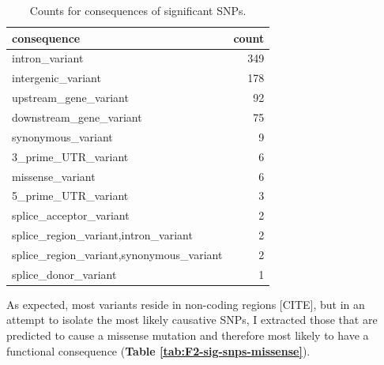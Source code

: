 \documentclass[
]{book}
\begin{document}
\begin{table}

\caption{\label{tab:F2-sig-snps-consq-counts}Counts for consequences of significant SNPs.}
\centering
\begin{tabular}[t]{l|r}
\hline
consequence & count\\
\hline
intron\_variant & 349\\
\hline
intergenic\_variant & 178\\
\hline
upstream\_gene\_variant & 92\\
\hline
downstream\_gene\_variant & 75\\
\hline
synonymous\_variant & 9\\
\hline
3\_prime\_UTR\_variant & 6\\
\hline
missense\_variant & 6\\
\hline
5\_prime\_UTR\_variant & 3\\
\hline
splice\_acceptor\_variant & 2\\
\hline
splice\_region\_variant,intron\_variant & 2\\
\hline
splice\_region\_variant,synonymous\_variant & 2\\
\hline
splice\_donor\_variant & 1\\
\hline
\end{tabular}
\end{table}

As expected, most variants reside in non-coding regions {[}CITE{]}, but in an attempt to isolate the most likely causative SNPs, I extracted those that are predicted to cause a missense mutation and therefore most likely to have a functional consequence (\textbf{Table \ref{tab:F2-sig-snps-missense}}).
\end{document}
